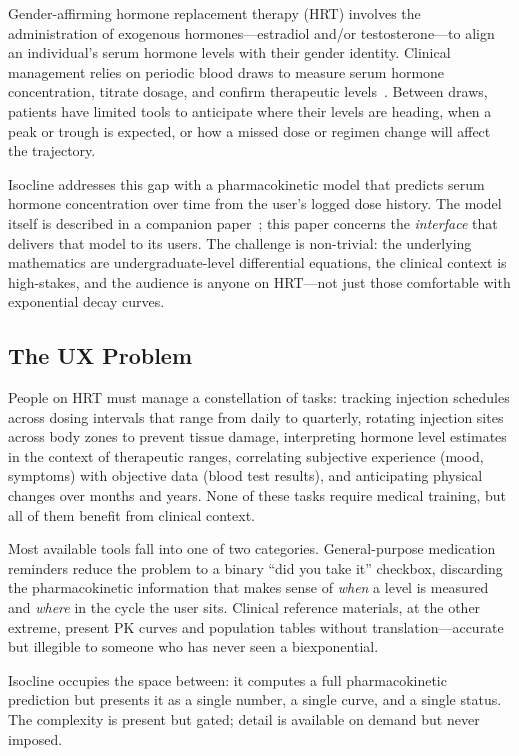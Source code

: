 \documentclass[11pt,a4paper]{article}
\begin{document}
Gender-affirming hormone replacement therapy (HRT) involves the
administration of exogenous hormones---estradiol and/or
testosterone---to align an individual's serum hormone levels with their
gender identity. Clinical management relies on periodic blood draws to
measure serum hormone concentration, titrate dosage, and confirm
therapeutic levels~\cite{hembree2017}. Between draws, patients have limited
tools to anticipate where their levels are heading, when a peak or trough
is expected, or how a missed dose or regimen change will affect the
trajectory.

Isocline addresses this gap with a pharmacokinetic model that predicts serum
hormone concentration over time from the user's logged dose history. The
model itself is described in a companion paper~\cite{xtpk}; this paper
concerns the \emph{interface} that delivers that model to its users. The
challenge is non-trivial: the underlying mathematics are undergraduate-level
differential equations, the clinical context is high-stakes, and the
audience is anyone on HRT---not just those comfortable with exponential
decay curves.

\subsection{The UX Problem}
\label{sec:ux_problem}

People on HRT must manage a constellation of tasks: tracking injection
schedules across dosing intervals that range from daily to quarterly,
rotating injection sites across body zones to prevent tissue damage,
interpreting hormone level estimates in the context of therapeutic
ranges, correlating subjective experience (mood, symptoms) with objective
data (blood test results), and anticipating physical changes over months
and years. None of these tasks require medical training, but all of them
benefit from clinical context.

Most available tools fall into one of two categories. General-purpose
medication reminders reduce the problem to a binary ``did you take it''
checkbox, discarding the pharmacokinetic information that makes sense of
\emph{when} a level is measured and \emph{where} in the cycle the user
sits. Clinical reference materials, at the other extreme, present PK
curves and population tables without translation---accurate but
illegible to someone who has never seen a biexponential.

Isocline occupies the space between: it computes a full pharmacokinetic
prediction but presents it as a single number, a single curve, and a
single status. The complexity is present but gated; detail is available
on demand but never imposed.
\end{document}
